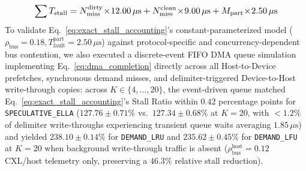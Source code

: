 \documentclass[conference,10pt]{IEEEtran}
\begin{document}
\begin{itemize}
    \begin{equation}
    \label{eq:exact_stall_accounting}
    \resizebox{0.84\columnwidth}{!}{$\displaystyle
    \sum T_{\text{stall}} = N_{\text{miss}}^{\text{dirty}}\!\times\!12.00\,\mu\text{s} + N_{\text{miss}}^{\text{clean}}\!\times\!9.00\,\mu\text{s} + M_{\text{part}}\!\times\!2.50\,\mu\text{s}$}
    \end{equation}
    To validate Eq.~\eqref{eq:exact_stall_accounting}'s constant-parameterized model ($\rho_{\text{bus}}=0.18, T_{\text{fault}}^{\text{part}}=2.50\,\mu\text{s}$) against protocol-specific and concurrency-dependent bus contention, we also executed a discrete-event FIFO DMA queue simulation implementing Eq.~\eqref{eq:dma_completion} directly across all Host-to-Device prefetches, synchronous demand misses, and delimiter-triggered Device-to-Host write-through copies: across $K \in \{4, \dots, 20\}$, the event-driven queue matched Eq.~\eqref{eq:exact_stall_accounting}'s Stall Ratio within $0.42$ percentage points for \texttt{SPECULATIVE\_ELLA} ($127.76 \pm 0.71\%$ vs.\ $127.34 \pm 0.68\%$ at $K=20$, with $<1.2\%$ of delimiter write-throughs experiencing transient queue waits averaging $1.85\,\mu\text{s}$) and yielded $238.10 \pm 0.14\%$ for \texttt{DEMAND\_LRU} and $235.62 \pm 0.45\%$ for \texttt{DEMAND\_LFU} at $K=20$ when background write-through traffic is absent ($\rho_{\text{bus}}^{\text{host}} = 0.12$ CXL/host telemetry only, preserving a $46.3\%$ relative stall reduction).

\end{itemize}
\end{document}
